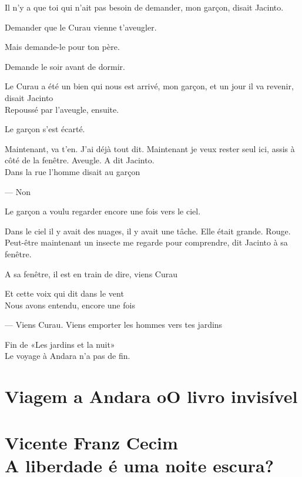 Il n'y a que toi qui n'ait pas besoin de demander, mon garçon, disait
Jacinto.

Demander que le Curau vienne t'aveugler.

Mais demande-le pour ton père.

Demande le soir avant de dormir.

Le Curau a été un bien qui nous est arrivé, mon garçon, et un jour il va
revenir, disait Jacinto\\

Repoussé par l'aveugle, ensuite.

Le garçon s'est écarté.

Maintenant, va t'en. J'ai déjà tout dit. Maintenant je veux rester seul
ici, assis à côté de la fenêtre. Aveugle. A dit Jacinto.\\

Dans la rue l'homme disait au garçon

--- Non

Le garçon a voulu regarder encore une fois vers le ciel.

Dans le ciel il y avait des nuages, il y avait une tâche. Elle était
grande. Rouge.\\

Peut-être maintenant un insecte me regarde pour comprendre, dit Jacinto
à sa fenêtre.

A sa fenêtre, il est en train de dire, viens Curau

\pagebreak

\vspace*{4cm}

Et cette voix qui dit dans le vent\\

Nous avons entendu, encore une fois

--- Viens Curau. Viens emporter les hommes vers tes jardins

\vfill
Fin de «Les jardins et la nuit»\\

Le voyage à Andara n'a pas de fin.


\clearpage{\pagestyle{empty}\cleardoublepage}
\movetooddpage
\part*{Viagem a Andara oO livro invisível\\
\bigskip
\bigskip
\bigskip
\bigskip
{}\\
\Large{Vicente Franz Cecim}\\
\bigskip
\bigskip
\normalsize{A liberdade é uma noite escura?}}



